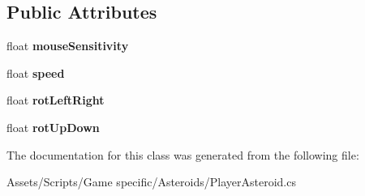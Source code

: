 \subsection*{Public Attributes}
\begin{DoxyCompactItemize}
\item 
\hypertarget{class_player_asteroid_a4fb2abd579481a079a0aae46caf3bdd9}{float {\bfseries mouse\-Sensitivity}}\label{class_player_asteroid_a4fb2abd579481a079a0aae46caf3bdd9}

\item 
\hypertarget{class_player_asteroid_ac4b71e4d57baf59c86ffa9ecc8669088}{float {\bfseries speed}}\label{class_player_asteroid_ac4b71e4d57baf59c86ffa9ecc8669088}

\item 
\hypertarget{class_player_asteroid_ada27e6cfdfaad9ec3e0dc914afdf1ab6}{float {\bfseries rot\-Left\-Right}}\label{class_player_asteroid_ada27e6cfdfaad9ec3e0dc914afdf1ab6}

\item 
\hypertarget{class_player_asteroid_a2e22f1e10e26d62163eeea3a82bfada5}{float {\bfseries rot\-Up\-Down}}\label{class_player_asteroid_a2e22f1e10e26d62163eeea3a82bfada5}

\end{DoxyCompactItemize}


The documentation for this class was generated from the following file\-:\begin{DoxyCompactItemize}
\item 
Assets/\-Scripts/\-Game specific/\-Asteroids/Player\-Asteroid.\-cs\end{DoxyCompactItemize}
